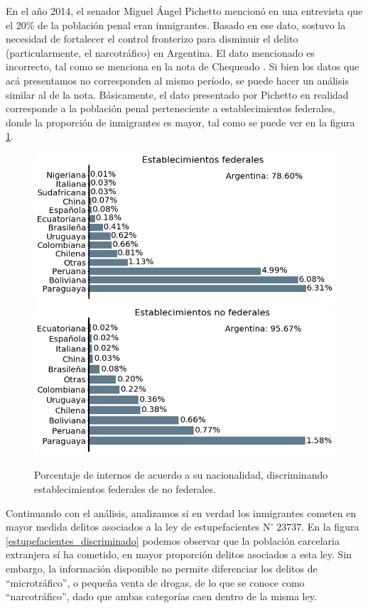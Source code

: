 \documentclass[10pt]{article}
\begin{document}
En el a\~no 2014, el senador Miguel \'Angel Pichetto mencion\'o en una entrevista que el 20\% de la poblaci\'on penal eran inmigrantes. Basado en ese dato, sostuvo la necesidad de fortalecer el control fronterizo para disminuir el delito (particularmente, el narcotr\'afico) en Argentina. El dato mencionado es incorrecto, tal como se menciona en la nota de Chequeado \cite{chequeadoInmigrantes}. Si bien los datos que ac\'a presentamos no corresponden al mismo per\'iodo, se puede hacer un an\'alisis similar al de la nota. B\'asicamente, el dato presentado por Pichetto en realidad corresponde a la poblaci\'on penal perteneciente a establecimientos federales, donde la proporci\'on de inmigrantes es mayor, tal como se puede ver en la figura \ref{nacionalidad_discriminado}. 

\begin{figure}[H]
	\centering
\includegraphics[scale=0.31]{graficos/nacionalidad_bar_federales.png}
\includegraphics[scale=0.31]{graficos/nacionalidad_bar_no_federales.png}
	\caption{Porcentaje de internos de acuerdo a su nacionalidad, discriminando establecimientos federales de no federales.\label{nacionalidad_discriminado}}
\end{figure}

Continuando con el an\'alisis, analizamos si en verdad los inmigrantes cometen en mayor medida delitos asociados a la ley de estupefacientes $\mathrm{N}^{\circ}\; 23737$. En la figura \ref{estupefacientes_discriminado} podemos observar que la poblaci\'on carcelaria extranjera s\'i ha cometido, en mayor proporci\'on delitos asociados a esta ley. Sin embargo, la informaci\'on disponible no permite diferenciar los delitos de ``microtr\'afico'', o peque\~na venta de drogas, de lo que se conoce como ``narcotr\'afico'', dado que ambas categor\'ias caen dentro de la misma ley. 
\end{document}
